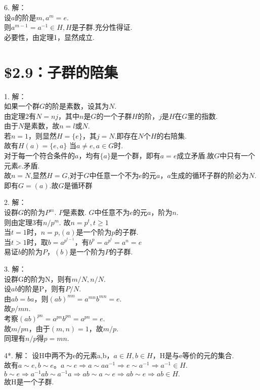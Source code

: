 \documentclass{ctexart}
\begin{document}
6.
解：\\
设$a$的阶是$m,a^m=e.$ \\
则$a^{m-1}=a^{-1} \in H,H$是子群.充分性得证.\\
必要性，由定理1，显然成立.

\section*{\$2.9：子群的陪集}
1.
解：\\
如果一个群$G$的阶是素数，设其为$N$.\\
由定理2有$N=nj$，其中$n$是$G$的一个子群$H$的阶，$j$是$H$在$G$里的指数.\\
由于$N$是素数，故$n=l$或$N$. \\
若$n=1$，则显然$H=\{e\}$，其$j=N$.即存在$N$个$H$的右陪集.\\
故有$H(a)=\{e,a\}$ 当$a \neq e, a\in G$时. \\
对于每一个符合条件的$a$，均有$\{a\}$是一个群，即有$a=e$成立矛盾.故$G$中只有一个元素$e$.矛盾.\\
故$n=N$,显然$H=G$,对于$G$中任意一个不为$e$的元$a$，$a$生成的循环子群的阶必为$N$.即有$G=(a)$.故$G$是循环群

2.
解：\\
设群$G$的阶为$P^m$. $P$是素数. $G$中任意不为$e$的元$a$，阶为$n$.\\
则由定理3有$n/p^m$. 故$n=p^t, t \geq 1$\\
当$t=1$时，$n=p$,$(a)$是一个阶为$p$的子群.\\
当$t>1$时，取$b=a^{p^{t-1}}$，有$b^p=a^{p^t}=a^n=e$\\
易证$b$的阶为$P$，$(b)$是一个阶为$P$的子群.

3.
解：\\
设群G的阶为N，则有$m/N,n/N$.\\
设$ab$的阶是P，则有$P/N$.\\
由$ab=ba$，则$(ab)^{mn}=a^{mn}b^{mn}=e$.\\
故$p/mn$.\\
考察$(ab)^{pn}=a^{pn}b^{pn}=a^{pn}=e$.\\
故$m/pn$，由于$(m,n)=1$，故$m/p$.\\
同理有$n/p$得$p=mn$.

4*.
解：
设H中两不为e的元素a,b，$a\in H,b \in H$，H是与e等价的元的集合.\\
故有$a\sim e,b\sim e。a\sim e \Rightarrow a\sim aa^{-1} \Rightarrow e\sim a^{-1} \Rightarrow a^{-1} \in H$.\\
$b\sim e \Rightarrow a^{-1}ab \sim a^{-1}a \Rightarrow ab\sim a\sim e \Rightarrow ab\sim e \Rightarrow ab\in H.$\\
故H是一个子群.
\end{document}
